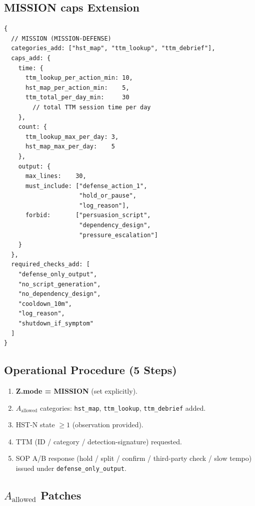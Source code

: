 \subsection{MISSION caps Extension}
\label{sec:a-allowed-mdef-caps}

\begin{lstlisting}[basicstyle=\ttfamily\scriptsize,frame=single]
{
  // MISSION (MISSION-DEFENSE)
  categories_add: ["hst_map", "ttm_lookup", "ttm_debrief"],
  caps_add: {
    time: {
      ttm_lookup_per_action_min: 10,
      hst_map_per_action_min:    5,
      ttm_total_per_day_min:     30
        // total TTM session time per day
    },
    count: {
      ttm_lookup_max_per_day: 3,
      hst_map_max_per_day:    5
    },
    output: {
      max_lines:    30,
      must_include: ["defense_action_1",
                     "hold_or_pause",
                     "log_reason"],
      forbid:       ["persuasion_script",
                     "dependency_design",
                     "pressure_escalation"]
    }
  },
  required_checks_add: [
    "defense_only_output",
    "no_script_generation",
    "no_dependency_design",
    "cooldown_10m",
    "log_reason",
    "shutdown_if_symptom"
  ]
}
\end{lstlisting}

\subsection{Operational Procedure (5 Steps)}
\label{sec:a-allowed-mdef-procedure}

\begin{enumerate}
\item \textbf{Z.mode = MISSION} (set explicitly).
\item $A_{\mathrm{allowed}}$ categories: \texttt{hst\_map},
\texttt{ttm\_lookup}, \texttt{ttm\_debrief} added.
\item HST-N state $\ge 1$ (observation provided).
\item TTM (ID / category / detection-signature) requested.
\item SOP A/B response (hold / split / confirm / third-party check
/ slow tempo) issued under \texttt{defense\_only\_output}.
\end{enumerate}

\subsection{$A_{\mathrm{allowed}}$ Patches}
\label{sec:a-allowed-mdef-patches}

